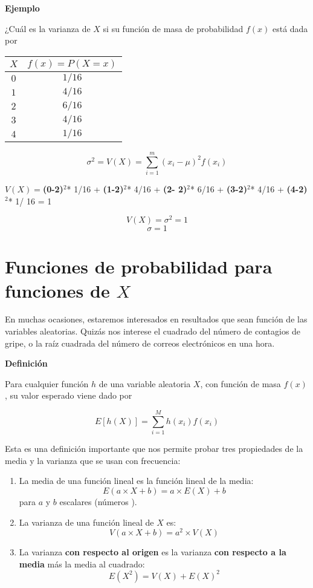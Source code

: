 \documentclass[
]{book}
\begin{document}
\textbf{Ejemplo}

¿Cuál es la varianza de \(X\) si su función de masa de probabilidad \(f(x)\) está dada por

\begin{longtable}[]{@{}cc@{}}
\toprule
\(X\) & \(f(x)=P(X=x)\) \\
\midrule
\endhead
\(0\) & \(1/16\) \\
\(1\) & \(4/16\) \\
\(2\) & \(6/16\) \\
\(3\) & \(4/16\) \\
\(4\) & \(1/16\) \\
\bottomrule
\end{longtable}

\[\sigma^2 =V(X)=\sum_{i=1}^m (x_i-\mu)^2 f(x_i)\]

\(V(X)=\)\textbf{(0-2)}\(^2\)* 1/16 + \textbf{(1-2)}\(^2\)* 4/16 + \textbf{(2- 2)}\(^2\)* 6/16 + \textbf{(3-2)}\(^2\)* 4/16 + \textbf{(4-2)}\(^2\)* 1/ 16 = 1

\[V(X)=\sigma^2=1\]
\[\sigma=1\]

\hypertarget{funciones-de-probabilidad-para-funciones-de-x}{%
\section{\texorpdfstring{Funciones de probabilidad para funciones de \(X\)}{Funciones de probabilidad para funciones de X}}\label{funciones-de-probabilidad-para-funciones-de-x}}

En muchas ocasiones, estaremos interesados en resultados que sean función de las variables aleatorias. Quizás nos interese el cuadrado del número de contagios de gripe, o la raíz cuadrada del número de correos electrónicos en una hora.

\textbf{Definición}

Para cualquier función \(h\) de una variable aleatoria \(X\), con función de masa \(f(x)\), su valor esperado viene dado por

\[ E[h(X)]= \sum_{i=1}^M h(x_i) f(x_i) \]

Esta es una definición importante que nos permite probar tres propiedades de la media y la varianza que se usan con frecuencia:

\begin{enumerate}
\def\labelenumi{\arabic{enumi})}
\item
  La media de una función lineal es la función lineal de la media: \[E(a\times X +b)= a\times E(X) +b\] para \(a\) y \(b\) escalares (números ).
\item
  La varianza de una función lineal de \(X\) es:\[V(a\times X +b)= a^2\times V(X)\]
\item
  La varianza \textbf{con respecto al origen} es la varianza \textbf{con respecto a la media} más la media al cuadrado: \[E(X^2)=V(X)+E(X)^2\]
\end{enumerate}
\end{document}
